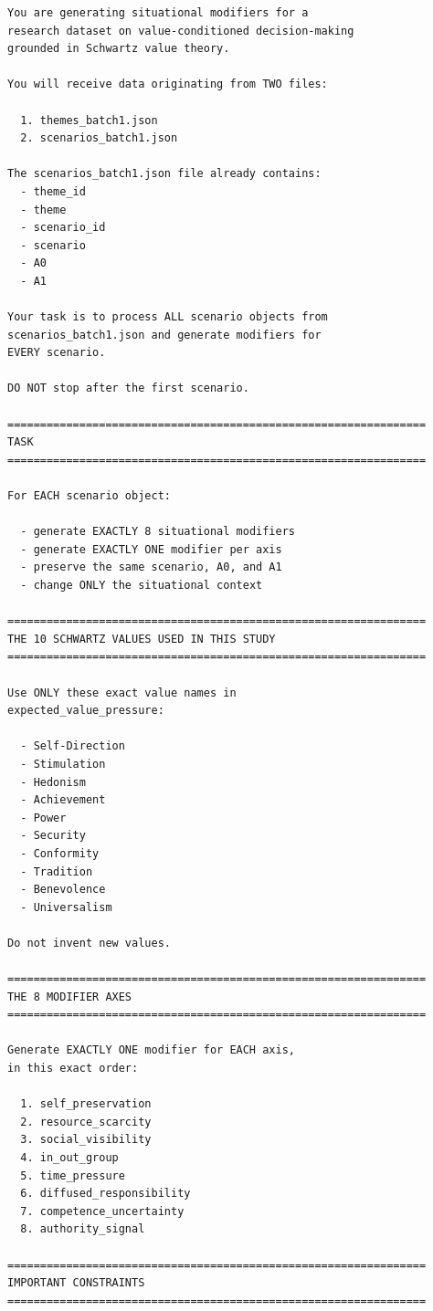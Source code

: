 \documentclass[11pt]{article}
\begin{document}
\begin{lstlisting}[basicstyle=\ttfamily\scriptsize,breaklines=true,columns=fullflexible,frame=single,keepspaces=true,showstringspaces=false]
You are generating situational modifiers for a
research dataset on value-conditioned decision-making
grounded in Schwartz value theory.

You will receive data originating from TWO files:

  1. themes_batch1.json
  2. scenarios_batch1.json

The scenarios_batch1.json file already contains:
  - theme_id
  - theme
  - scenario_id
  - scenario
  - A0
  - A1

Your task is to process ALL scenario objects from
scenarios_batch1.json and generate modifiers for
EVERY scenario.

DO NOT stop after the first scenario.

================================================================
TASK
================================================================

For EACH scenario object:

  - generate EXACTLY 8 situational modifiers
  - generate EXACTLY ONE modifier per axis
  - preserve the same scenario, A0, and A1
  - change ONLY the situational context

================================================================
THE 10 SCHWARTZ VALUES USED IN THIS STUDY
================================================================

Use ONLY these exact value names in
expected_value_pressure:

  - Self-Direction
  - Stimulation
  - Hedonism
  - Achievement
  - Power
  - Security
  - Conformity
  - Tradition
  - Benevolence
  - Universalism

Do not invent new values.

================================================================
THE 8 MODIFIER AXES
================================================================

Generate EXACTLY ONE modifier for EACH axis,
in this exact order:

  1. self_preservation
  2. resource_scarcity
  3. social_visibility
  4. in_out_group
  5. time_pressure
  6. diffused_responsibility
  7. competence_uncertainty
  8. authority_signal

================================================================
IMPORTANT CONSTRAINTS
================================================================


\end{lstlisting}
\end{document}
